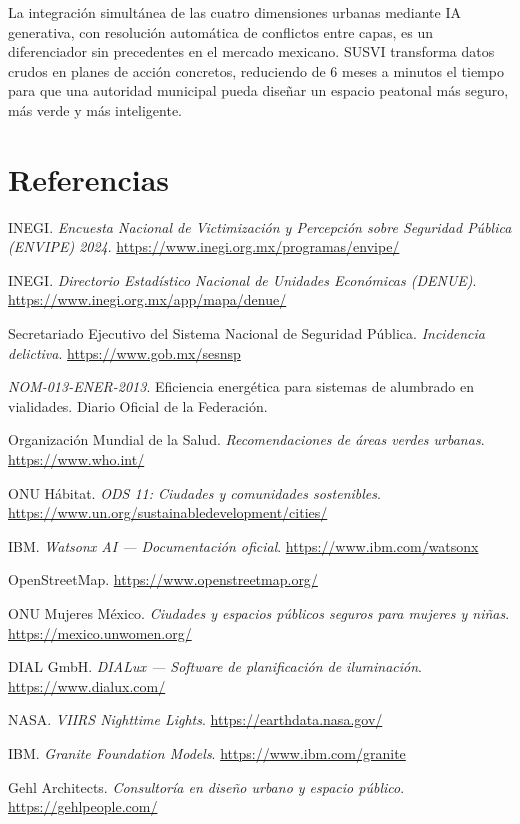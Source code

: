 \documentclass[12pt,a4paper]{article}
\begin{document}
La integración simultánea de las cuatro dimensiones urbanas mediante IA generativa, con resolución automática de conflictos entre capas, es un diferenciador sin precedentes en el mercado mexicano. SUSVI transforma datos crudos en planes de acción concretos, reduciendo de 6 meses a minutos el tiempo para que una autoridad municipal pueda diseñar un espacio peatonal más seguro, más verde y más inteligente.


\newpage
\section{Referencias}

\begin{enumerate}[label={[\arabic*]}, leftmargin=1.5cm]
  \item INEGI. \textit{Encuesta Nacional de Victimización y Percepción sobre Seguridad Pública (ENVIPE) 2024}. \url{https://www.inegi.org.mx/programas/envipe/}
  \item INEGI. \textit{Directorio Estadístico Nacional de Unidades Económicas (DENUE)}. \url{https://www.inegi.org.mx/app/mapa/denue/}
  \item Secretariado Ejecutivo del Sistema Nacional de Seguridad Pública. \textit{Incidencia delictiva}. \url{https://www.gob.mx/sesnsp}
  \item \textit{NOM-013-ENER-2013}. Eficiencia energética para sistemas de alumbrado en vialidades. Diario Oficial de la Federación.
  \item Organización Mundial de la Salud. \textit{Recomendaciones de áreas verdes urbanas}. \url{https://www.who.int/}
  \item ONU Hábitat. \textit{ODS 11: Ciudades y comunidades sostenibles}. \url{https://www.un.org/sustainabledevelopment/cities/}
  \item IBM. \textit{Watsonx AI — Documentación oficial}. \url{https://www.ibm.com/watsonx}
  \item OpenStreetMap. \url{https://www.openstreetmap.org/}
  \item ONU Mujeres México. \textit{Ciudades y espacios públicos seguros para mujeres y niñas}. \url{https://mexico.unwomen.org/}
  \item DIAL GmbH. \textit{DIALux — Software de planificación de iluminación}. \url{https://www.dialux.com/}
  \item NASA. \textit{VIIRS Nighttime Lights}. \url{https://earthdata.nasa.gov/}
  \item IBM. \textit{Granite Foundation Models}. \url{https://www.ibm.com/granite}
  \item Gehl Architects. \textit{Consultoría en diseño urbano y espacio público}. \url{https://gehlpeople.com/}
\end{enumerate}
\end{document}
